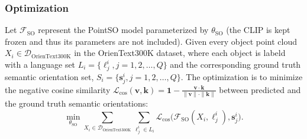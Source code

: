 \subsubsection{Optimization}
Let $\mathcal{F}_{\text{SO}}$ represent the PointSO model parameterized by $\theta_{\text{SO}}$ (the CLIP is kept frozen and thus its parameters are not included).
Given every object point cloud $X_i \in \mathcal{D}_{\text{OrienText300K}}$ in the OrienText300K dataset, where each object is labeld with a language set $L_i=\{\ell_j^i, j=1,2,\dots,Q\}$ and the corresponding ground truth semantic orientation set, $S_i=\{\mathbf{s}^i_j, j=1,2,\dots,Q\}$.
The optimization is to minimize the negative cosine similarity $\mathcal{L}_{\text{cos}}(\mathbf{v},\mathbf{k})=\mathbf{1}-\frac{\mathbf{v}\cdot\mathbf{k}}{\|\mathbf{v}\|\cdot\|\mathbf{k}\|}$ between predicted and the ground truth semantic orientations:
\begin{equation}
    \min_{\theta_{\text{SO}}} \sum_{X_i \in \mathcal{D}_{\text{OrienText300K}}} \sum_{\ell_j^i\in L_i} 
    \mathcal{L}_{\text{cos}}
    \Big(
    \mathcal{F}_{\text{SO}}(X_i, \ell_j^i), \mathbf{s}^i_j
    \Big).
\end{equation}